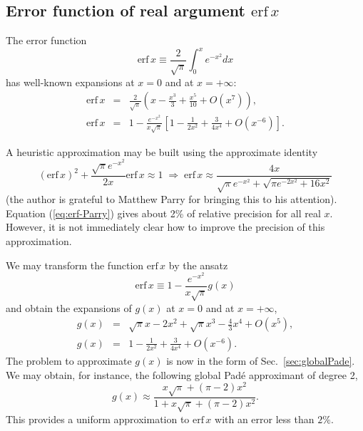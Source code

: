 \documentclass{llncs}
\begin{document}
\subsection{Error function of real argument $\textrm{erf}\, x$}

The error function \begin{equation}
\textrm{erf}\, x\equiv \frac{2}{\sqrt{\pi }}\int _{0}^{x}e^{-x^{2}}dx\end{equation}
 has well-known expansions at $x=0$ and at $x=+\infty $:\begin{eqnarray}
\textrm{erf}\, x & = & \frac{2}{\sqrt{\pi }}\left(x-\frac{x^{3}}{3}+\frac{x^{5}}{10}+O\left(x^{7}\right)\right),\label{eq:erfexp1}\\
\textrm{erf}\, x & = & 1-\frac{e^{-x^{2}}}{x\sqrt{\pi }}\left[1-\frac{1}{2x^{2}}+\frac{3}{4x^{4}}+O\left(x^{-6}\right)\right].\label{eq:erfexp2}
\end{eqnarray}


A heuristic approximation may be built using the approximate identity\begin{equation}
\left(\textrm{erf}\, x\right)^{2}+\frac{\sqrt{\pi }e^{-x^{2}}}{2x}\textrm{erf}\, x\approx 1\; \Rightarrow \; \textrm{erf}\, x\approx \frac{4x}{\sqrt{\pi }e^{-x^{2}}+\sqrt{\pi e^{-2x^{2}}+16x^{2}}}\label{eq:erf-Parry}\end{equation}
(the author is grateful to Matthew Parry for bringing this to his
attention). Equation (\ref{eq:erf-Parry}) gives about 2\% of relative
precision for all real $x$. However, it is not immediately clear
how to improve the precision of this approximation.

We may transform the function $\textrm{erf}\, x$ by the ansatz\begin{equation}
\textrm{erf}\, x\equiv 1-\frac{e^{-x^{2}}}{x\sqrt{\pi }}g\left(x\right)\label{eq:erfansatz}\end{equation}
 and obtain the expansions of $g\left(x\right)$ at $x=0$ and at
$x=+\infty $,\begin{eqnarray}
g\left(x\right) & = & \sqrt{\pi }x-2x^{2}+\sqrt{\pi }x^{3}-\frac{4}{3}x^{4}+O\left(x^{5}\right),\\
g\left(x\right) & = & 1-\frac{1}{2x^{2}}+\frac{3}{4x^{4}}+O\left(x^{-6}\right).
\end{eqnarray}
The problem to approximate $g\left(x\right)$ is now in the form of
Sec.~\ref{sec:globalPade}. We may obtain, for instance, the following
global Pad\'e approximant of degree 2,\begin{equation}
g\left(x\right)\approx \frac{x\sqrt{\pi }+\left(\pi -2\right)x^{2}}{1+x\sqrt{\pi }+\left(\pi -2\right)x^{2}}.\end{equation}
 This provides a uniform approximation to $\textrm{erf}\, x$ with
an error less than $2\%$.
\end{document}
